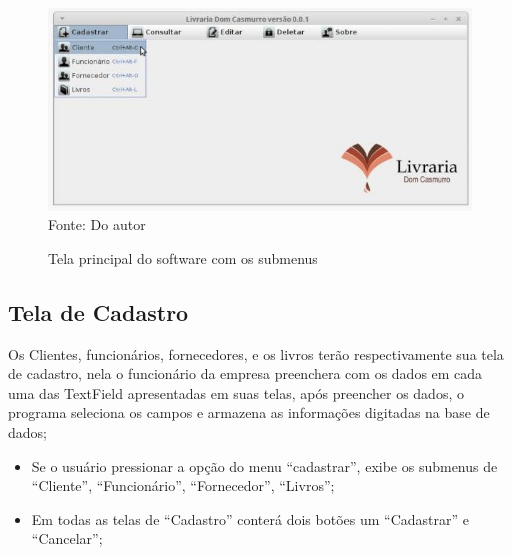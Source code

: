  
 \begin{figure}[H]
	\centering 
	\caption{Tela principal do software com os submenus}
	\label{principal-menu}
	\includegraphics[scale = 0.8]{imagens/tela-principal-menu.jpg}
	\\Fonte: Do autor
\end{figure}



\subsection{Tela de Cadastro}

Os Clientes, funcionários, fornecedores, e os livros terão respectivamente sua tela de cadastro, nela o funcionário 
da empresa preenchera com os dados em cada uma das TextField apresentadas em suas telas, após preencher os dados, o 
programa seleciona os campos e armazena as informações digitadas na base de dados;

\begin{itemize}
 \item Se o usuário pressionar a opção do menu “cadastrar”, exibe os submenus de “Cliente”, “Funcionário”, “Fornecedor”, “Livros”;
 \item Em todas as telas de “Cadastro” conterá dois botões um “Cadastrar” e “Cancelar”;
\end{itemize}

